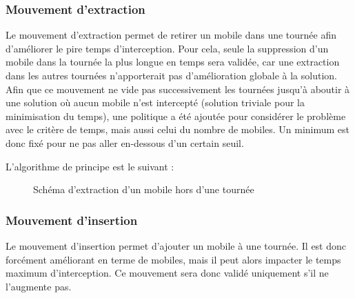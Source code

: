 		\subsubsection{Mouvement d'extraction}
			Le mouvement d'extraction permet de retirer un mobile dans une tournée afin d'améliorer le pire temps d'interception. Pour cela, seule la suppression d'un mobile dans la tournée la plus longue en temps sera validée, car une extraction dans les autres tournées n'apporterait pas d'amélioration globale à la solution. Afin que ce mouvement ne vide pas successivement les tournées jusqu'à aboutir à une solution où aucun mobile n'est intercepté (solution triviale pour la minimisation du temps), une politique a été ajoutée pour considérer le problème avec le critère de temps, mais aussi celui du nombre de mobiles. Un minimum est donc fixé pour ne pas aller en-dessous d'un certain seuil.
			
			\newpage
			L'algorithme de principe est le suivant :
			\begin{code}
				\begin{algo}[informal]
					\BEGIN
							\ENDIF
						\ENDFORGEN
					\END
				\end{algo}
			\end{code}
			
			\label{subs:move_extract}
			\begin{figure}[h!]
			\centering
			\begin{tikzpicture}[schema]
				
			\end{tikzpicture}
			\caption{Schéma d'extraction d'un mobile hors d'une tournée}
			\label{fig:move_extract}
			\end{figure}

		\subsubsection{Mouvement d'insertion}
			Le mouvement d'insertion permet d'ajouter un mobile à une tournée. Il est donc forcément améliorant en terme de mobiles, mais il peut alors impacter le temps maximum d'interception. Ce mouvement sera donc validé uniquement s'il ne l'augmente pas.
			

